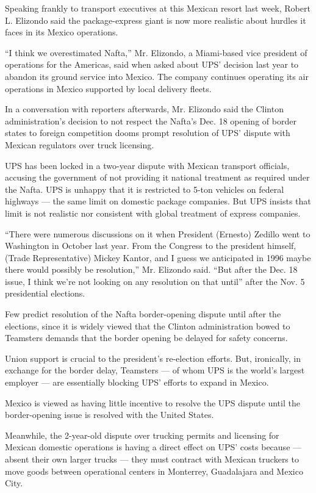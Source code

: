 \documentclass[letterpaper,12pt]{article}
\begin{document}
Speaking frankly to transport executives at this Mexican resort last
week, Robert L. Elizondo said the package-express giant is now more
realistic about hurdles it faces in its Mexico operations.

``I think we overestimated Nafta,'' Mr. Elizondo, a Miami-based vice
president of operations for the Americas, said when asked about UPS'
decision last year to abandon its ground service into Mexico. The
company continues operating its air operations in Mexico supported
by local delivery fleets.

In a conversation with reporters afterwards, Mr. Elizondo said the
Clinton administration's decision to not respect the Nafta's Dec. 18
opening of border states to foreign competition dooms prompt
resolution of UPS' dispute with Mexican regulators over truck
licensing.

UPS has been locked in a two-year dispute with Mexican transport
officials, accusing the government of not providing it national
treatment as required under the Nafta. UPS is unhappy that it is
restricted to 5-ton vehicles on federal highways --- the same limit
on domestic package companies. But UPS insists that limit is not
realistic nor consistent with global treatment of express companies.

``There were numerous discussions on it when President (Ernesto)
Zedillo went to Washington in October last year. From the Congress
to the president himself, (Trade Representative) Mickey Kantor, and
I guess we anticipated in 1996 maybe there would possibly be
resolution,'' Mr. Elizondo said. ``But after the Dec. 18 issue, I
think we're not looking on any resolution on that until'' after the
Nov. 5 presidential elections.

Few predict resolution of the Nafta border-opening dispute until
after the elections, since it is widely viewed that the Clinton
administration bowed to Teamsters demands that the border opening be
delayed for safety concerns.

Union support is crucial to the president's re-election efforts.
But, ironically, in exchange for the border delay, Teamsters --- of
whom UPS is the world's largest employer --- are essentially
blocking UPS' efforts to expand in Mexico.

Mexico is viewed as having little incentive to resolve the UPS
dispute until the border-opening issue is resolved with the United
States.

Meanwhile, the 2-year-old dispute over trucking permits and
licensing for Mexican domestic operations is having a direct effect
on UPS' costs because --- absent their own larger trucks --- they
must contract with Mexican truckers to move goods between
operational centers in Monterrey, Guadalajara and Mexico City.
\end{document}
